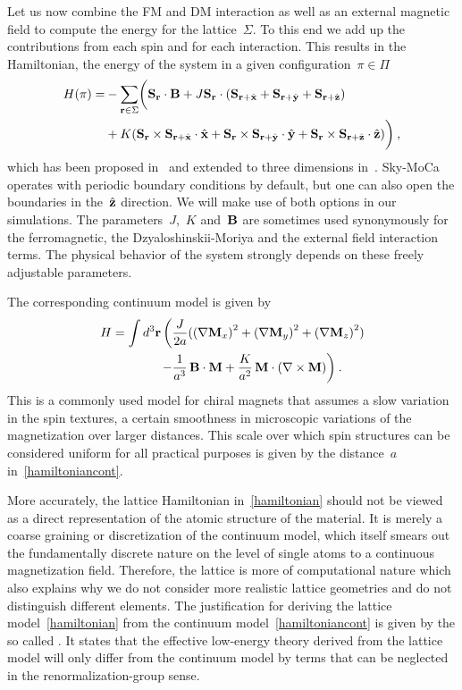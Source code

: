 Let us now combine the FM and DM interaction as well as an external magnetic
field to compute the energy for the lattice~$\Sigma$. To this end we add up the
contributions from each spin and for each interaction. This results in the
Hamiltonian, \ie{} the energy of the system in a given configuration~$\pi \in
\Pi$
%
\begin{align}\label{hamiltonian}
  H(\pi) = &-\sum_{\mathbf{r} \in \Sigma}\biggl(\mathbf{S}_{\mathbf{r}} \cdot \mathbf{B} +
      J \mathbf{S}_{\mathbf{r}} \cdot (\mathbf{S}_{\mathbf{r}+\hat{\mathbf{x}}} + \mathbf{S}_{\mathbf{r}+\hat{\mathbf{y}}} + \mathbf{S}_{\mathbf{r}+\hat{\mathbf{z}}})\nonumber \\
      &+ K (\mathbf{S}_{\mathbf{r}} \times \mathbf{S}_{\mathbf{r}+\hat{\mathbf{x}}} \cdot \hat{\mathbf{x}} +
            \mathbf{S}_{\mathbf{r}} \times \mathbf{S}_{\mathbf{r}+\hat{\mathbf{y}}} \cdot \hat{\mathbf{y}} +
            \mathbf{S}_{\mathbf{r}} \times \mathbf{S}_{\mathbf{r}+\hat{\mathbf{z}}} \cdot \hat{\mathbf{z}})\biggr)\:,
\end{align}
%
which has been proposed in~\cite{skyrm13} and extended to three dimensions
in~\cite{skyrmion}. Sky-MoCa operates with periodic boundary conditions by
default, but one can also open the boundaries in the~$\hat{\mathbf{z}}$ direction. We will
make use of both options in our simulations. The parameters~$J$,~$K$ and~$\mathbf{B}$
are sometimes used synonymously for the ferromagnetic, the Dzyaloshinskii-Moriya
and the external field interaction terms. The physical behavior of the system
strongly depends on these freely adjustable parameters.

The corresponding continuum model is given by~\cite{skyrm4, skyrm12}
%
\begin{align}\label{hamiltoniancont}
  H = \int d^3 \mathbf{r}\, \biggl( & \frac{J}{2 a}
  ({(\nabla \mathbf{M}_x)}^2 + {(\nabla \mathbf{M}_y)}^2 + {(\nabla \mathbf{M}_z)}^2)\nonumber \\
  - & \frac{1}{a^3}\, \mathbf{B} \cdot \mathbf{M} +
  \frac{K}{a^2}\, \mathbf{M} \cdot (\nabla \times \mathbf{M}) \biggr) \:.
\end{align}
%
This is a commonly used model for chiral magnets that assumes a slow variation
in the spin textures, \ie{} a certain smoothness in microscopic variations of
the magnetization over larger distances. This scale over which spin structures
can be considered uniform for all practical purposes is given by the
distance~$a$ in~\eqref{hamiltoniancont}.

More accurately, the lattice Hamiltonian in~\eqref{hamiltonian} should not be
viewed as a direct representation of the atomic structure of the material. It is
merely a coarse graining or discretization of the continuum model, which itself
smears out the fundamentally discrete nature on the level of single atoms to a
continuous magnetization field. Therefore, the lattice is more of computational
nature which also explains why we do not consider more realistic lattice
geometries and do not distinguish different elements. The justification for
deriving the lattice model~\eqref{hamiltonian} from the continuum
model~\eqref{hamiltoniancont} is given by the so called . It states that the effective low-energy theory derived from the
lattice model will only differ from the continuum model by terms that can be
neglected in the renormalization-group sense.


